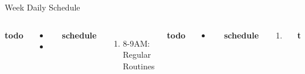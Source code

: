 \documentclass[serif, mathserif, final]{beamer}
\newcommand{\doneTask}[1]{\tiny \item \tiny \sout{#1}}
\newcommand{\te}[1]{\textit{TimeEst:} \textit{#1}}
\begin{document}
\begin{frame}
\begin{columns}
\begin{column}{0.50\linewidth}
      \begin{block}{Week Daily Schedule} 
        \begin{columns} 
          \textbf{\small todo} \\ 
          \begin{itemize}
            \tiny \item \tiny 
          \item \tiny 
          \end{itemize} 
          \textbf{\small schedule} \\
          \begin{enumerate} 
            \tiny \item \tiny 8-9AM: Regular Routines 
          \end{enumerate} 
          
          \textbf{\small todo} \\
          \begin{itemize}
            \tiny \item \tiny             
          \end{itemize}  
          \textbf{\small schedule}\\ 
          \begin{enumerate} 
            \tiny \item \tiny
          \end{enumerate}  

          \textbf{\small todo} \\
          \begin{itemize}
            \doneTask{Work: send message to Jon} 
          \item \tiny Work: write out the performance estimation.  
          \item \tiny Work: write out perf. estimate. \te{10 mins}
          \item \tiny Mgmt: Spaces: get meds + Mgmt:Spaces: update
            3-month plan 
            \doneTask{Comm: message to Vinita} 
         

\end{itemize}
\end{columns}
\end{block}
\end{column}
\end{columns}
\end{frame}
\end{document}
